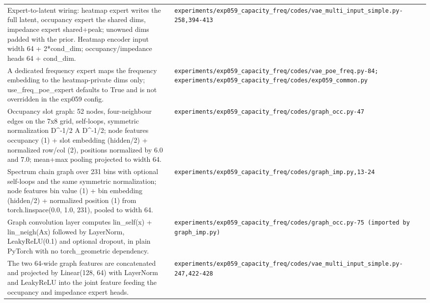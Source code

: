 \begin{longtable}{p{} p{}}
Expert-to-latent wiring: heatmap expert writes the full latent, occupancy expert the shared dims, impedance expert shared+peak; unowned dims padded with the prior. Heatmap encoder input width 64 + 2*cond\_dim; occupancy/impedance heads 64 + cond\_dim. & \texttt{experiments/\allowbreak{}exp059\_\allowbreak{}capacity\_\allowbreak{}freq/\allowbreak{}codes/\allowbreak{}vae\_\allowbreak{}multi\_\allowbreak{}input\_\allowbreak{}simple.py-258,394-413} \\
A dedicated frequency expert maps the frequency embedding to the heatmap-private dims only; use\_freq\_poe\_expert defaults to True and is not overridden in the exp059 config. & \texttt{experiments/\allowbreak{}exp059\_\allowbreak{}capacity\_\allowbreak{}freq/\allowbreak{}codes/\allowbreak{}vae\_\allowbreak{}poe\_\allowbreak{}freq.py-84; experiments/\allowbreak{}exp059\_\allowbreak{}capacity\_\allowbreak{}freq/\allowbreak{}codes/\allowbreak{}exp059\_\allowbreak{}common.py} \\
Occupancy slot graph: 52 nodes, four-neighbour edges on the 7x8 grid, self-loops, symmetric normalization D\textasciicircum{}-1/2 A D\textasciicircum{}-1/2; node features occupancy (1) + slot embedding (hidden/2) + normalized row/col (2), positions normalized by 6.0 and 7.0; mean+max pooling projected to width 64. & \texttt{experiments/\allowbreak{}exp059\_\allowbreak{}capacity\_\allowbreak{}freq/\allowbreak{}codes/\allowbreak{}graph\_\allowbreak{}occ.py-47} \\
Spectrum chain graph over 231 bins with optional self-loops and the same symmetric normalization; node features bin value (1) + bin embedding (hidden/2) + normalized position (1) from torch.linspace(0.0, 1.0, 231), pooled to width 64. & \texttt{experiments/\allowbreak{}exp059\_\allowbreak{}capacity\_\allowbreak{}freq/\allowbreak{}codes/\allowbreak{}graph\_\allowbreak{}imp.py,13-24} \\
Graph convolution layer computes lin\_self(x) + lin\_neigh(Ax) followed by LayerNorm, LeakyReLU(0.1) and optional dropout, in plain PyTorch with no torch\_geometric dependency. & \texttt{experiments/\allowbreak{}exp059\_\allowbreak{}capacity\_\allowbreak{}freq/\allowbreak{}codes/\allowbreak{}graph\_\allowbreak{}occ.py-75 (imported by graph\_\allowbreak{}imp.py)} \\
The two 64-wide graph features are concatenated and projected by Linear(128, 64) with LayerNorm and LeakyReLU into the joint feature feeding the occupancy and impedance expert heads. & \texttt{experiments/\allowbreak{}exp059\_\allowbreak{}capacity\_\allowbreak{}freq/\allowbreak{}codes/\allowbreak{}vae\_\allowbreak{}multi\_\allowbreak{}input\_\allowbreak{}simple.py-247,422-428} \\

\end{longtable}
